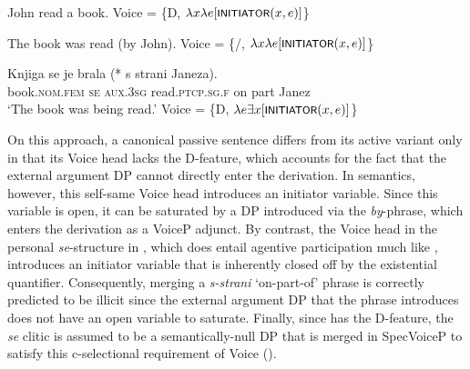 \documentclass[output=paper,
modfonts,nonflat,
newtxmath
]{langsci/langscibook}
\begin{document}
\begin{exe}
\ex \begin{xlist} \label{ex:lenardic: 17}
\ex \label{ex:lenardic: 17a} John read a book.
\ex \label{ex:lenardic: 17b} Voice = \{D, $\lambda x\lambda e[\cnst{initiator}(x, e)]$\}
\end{xlist}
\ex \begin{xlist} \label{ex:lenardic: 18}
\ex \label{ex:lenardic: 18a} The book was read (by John).
\ex Voice = \{/, $\lambda x\lambda e[\cnst{initiator}(x, e)]$\}
\end{xlist} 
\ex \begin{xlist} \label{ex:lenardic: 19}
\ex \label{ex:lenardic: 19a} \gll Knjiga se je brala (*\hspace{-2pt} s strani Janeza).
\\
book.\textsc{nom}.\textsc{fem} \textsc{se} \textsc{aux}.\textsc{3sg} read.\textsc{ptcp.sg.f} {} on part Janez\\
\trans `The book was being read.'
\ex \label{ex:lenardic: 19b} Voice = \{D, $\lambda e\exists x[\cnst{initiator}(x, e)]$\} 
\end{xlist}
\end{exe} \par

\noindent On this approach, a canonical passive sentence  differs from its active variant  only in that its Voice head lacks the D-feature, which accounts for the fact that the external argument DP cannot directly enter the derivation. In semantics, however, this self-same Voice head introduces an initiator variable. Since this variable is open, it can be saturated  by a DP introduced  via the \textit{by}-phrase, which enters the derivation as a VoiceP adjunct. By contrast, the Voice head in the personal \textit{se}-structure in , which does entail agentive participation much like , introduces an initiator variable that is inherently closed off by the existential quantifier. Consequently, merging a \textit{s-strani} `on-part-of' phrase is correctly predicted to be illicit since the external argument DP that the phrase introduces does not have an open variable to saturate.  Finally, since  has the D-feature, the \textit{se} clitic is assumed to be a semantically-null DP that is merged in SpecVoiceP to satisfy this c-selectional requirement of Voice (\citealt{schaffer2017}). \par
\end{document}
